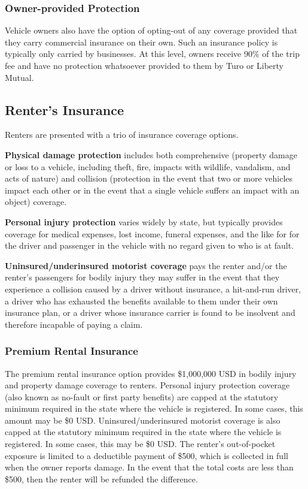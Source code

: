 \documentclass[review,12pt]{elsarticle}
\begin{document}
\subsubsection{Owner-provided Protection}
Vehicle owners also have the option of opting-out of any coverage provided that they carry commercial insurance on their own. Such an insurance policy is typically only carried by businesses. At this level, owners receive 90\% of the trip fee and have no protection whatsoever provided to them by Turo or Liberty Mutual.

\subsection{Renter's Insurance}\label{renters-insurance}
Renters are presented with a trio of insurance coverage options.

\textbf{Physical damage protection} includes both comprehensive (property damage or loss to a vehicle, including theft, fire, impacts with wildlife,  vandalism, and acts of nature) and collision (protection in the event that two or more vehicles impact each other or in the event that a single vehicle suffers an impact with an object) coverage.

\textbf{Personal injury protection} varies widely by state, but typically provides coverage for medical expenses, lost income, funeral expenses, and the like for for the driver and passenger in the vehicle with no regard given to who is at fault.

\textbf{Uninsured/underinsured motorist coverage} pays the renter and/or the renter's passengers for bodily injury they may suffer in the event that they experience a collision caused by a driver without insurance, a hit-and-run driver, a driver who has exhausted the benefits available to them under their own insurance plan, or a driver whose insurance carrier is found to be insolvent and therefore incapable of paying a claim.

\subsubsection{Premium Rental Insurance}\label{premium-rental-insurance}
The premium rental insurance option provides \$1,000,000 USD in bodily injury and property damage coverage to renters. Personal injury protection coverage (also known as no-fault or first party benefits) are capped at the statutory minimum required in the state where the vehicle is registered. In some cases, this amount may be \$0 USD. Uninsured/underinsured motorist coverage is also capped at the statutory minimum required in the state where the vehicle is registered. In some cases, this may be \$0 USD. The renter's out-of-pocket exposure is limited to a deductible payment of \$500, which is collected in full when the owner reports damage. In the event that the total costs are less than \$500, then the renter will be refunded the difference.
\end{document}
